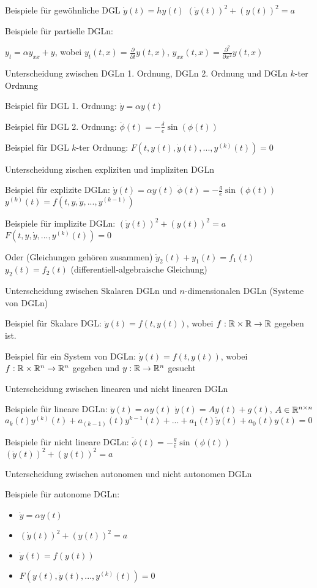 \documentclass{cheat-sheet}
\begin{document}
Beispiele für gewöhnliche DGL
$\dot{y}(t) = h y(t)$
$(\dot{y}(t))^2 + (y(t))^2 = a$

Beispiele für partielle DGLn:

$y_t = \alpha y_{xx} + y$, wobei $y_t(t,x) = \tfrac{\partial}{\partial t} y(t, x)$, $y_{xx}(t, x) = \tfrac{\partial^2}{\partial x^2} y(t, x)$


Unterscheidung zwischen DGLn 1. Ordnung, DGLn 2. Ordnung und DGLn $k$-ter Ordnung

Beispiel für DGL 1. Ordnung:
$\dot{y} = \alpha y(t)$

Beispiel für DGL 2. Ordnung:
$\ddot{\phi}(t) = - \tfrac{\delta}{e} \sin(\phi(t))$

Beispiel für DGL $k$-ter Ordnung:
$F(t, y(t), \dot{y}(t), ..., y^{(k)}(t)) = 0$


Unterscheidung zischen expliziten und impliziten DGLn

Beispiel für explizite DGLn:
$\dot{y}(t) = \alpha y(t)$
$\ddot{\phi}(t) = - \tfrac{g}{e} \sin(\phi(t))$
$y^{(k)}(t) = f(t, y, \dot{y}, ..., y^{(k-1)})$

Beispiele für implizite DGLn:
$(\dot{y}(t))^2 + (y(t))^2 = a$
$F(t, y, \dot{y}, ..., y^{(k)}(t)) = 0$

Oder (Gleichungen gehören zusammen)
$\dot{y}_2(t) + y_1(t) = f_1(t)$
$y_2(t) = f_2(t)$
(differentiell-algebraische Gleichung)

Unterscheidung zwischen Skalaren DGLn und $n$-dimensionalen DGLn (Systeme von DGLn)

Beispiel für Skalare DGL:
$\dot{y}(t) = f(t, y(t))$, wobei $f : \mathbb{R} \times \mathbb{R} \to \mathbb{R}$ gegeben ist.

Beispiel für ein System von DGLn:
$\dot{y}(t) = f(t, y(t))$, wobei $f : \mathbb{R} \times \mathbb{R}^n \to \mathbb{R}^n$ gegeben und $y : \mathbb{R} \to \mathbb{R}^n$ gesucht

Unterscheidung zwischen linearen und nicht linearen DGLn

Beispiele für lineare DGLn:
$\dot{y}(t) = \alpha y(t)$
$\dot{y}(t) = A y(t) + g(t)$, $A \in \mathbb{R}^{n \times n}$
$a_k(t) y^{(k)}(t) + a_{(k-1)}(t) y^{k-1}(t) + ... + a_1(t) \dot{y}(t) + a_0(t)y(t) = 0$

Beispiele für nicht lineare DGLn:
$\ddot{\phi}(t) = - \tfrac{g}{e} \sin(\phi(t))$
$(\dot{y}(t))^2 + (y(t))^2 = a$

Unterscheidung zwischen autonomen und nicht autonomen DGLn

Beispiele für autonome DGLn:
\begin{itemize}
  \item $\dot{y} = \alpha y(t)$
  \item $(\dot{y}(t))^2 + (y(t))^2 = a$
  \item $\dot{y}(t) = f(y(t))$
  \item $F(y(t), \dot{y}(t), ..., y^{(k)}(t)) = 0$
\end{itemize}
\end{document}

